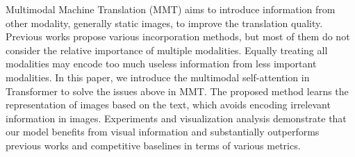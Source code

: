 Multimodal Machine Translation (MMT) aims to introduce information from other modality, generally static images, to improve the translation quality. Previous works propose various incorporation methods, but most of them do not consider the relative importance of multiple modalities. Equally treating all modalities may encode too much useless information from less important modalities. In this paper, we introduce the multimodal self-attention in Transformer to solve the issues above in MMT. The proposed method learns the representation of images based on the text, which avoids encoding irrelevant information in images. Experiments and visualization analysis demonstrate that our model benefits from visual information and substantially outperforms previous works and competitive baselines in terms of various metrics.
